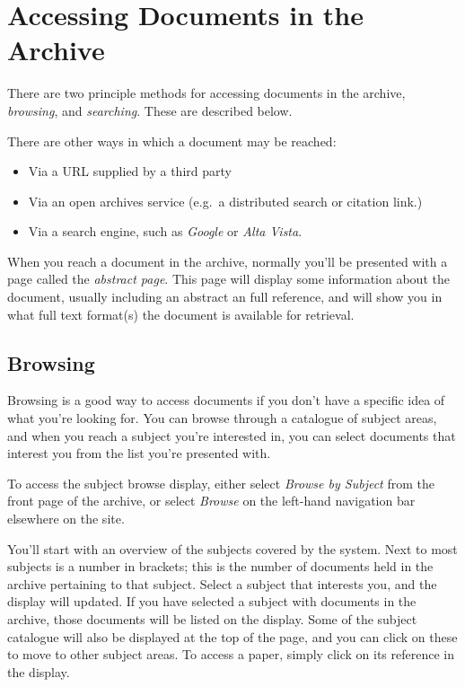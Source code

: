 
\section{Accessing Documents in the Archive}

There are two principle methods for accessing documents in the archive, \emph{browsing}, and \emph{searching}. These are described below.

There are other ways in which a document may be reached:

\begin{itemize}
\item Via a URL supplied by a third party
\item Via an open archives service (e.g.\ a distributed search or citation link.)
\item Via a search engine, such as \emph{Google} or \emph{Alta Vista}.
\end{itemize}

When you reach a document in the archive, normally you'll be presented with a page called the \emph{abstract page}. This page will display some information about the document, usually including an abstract an full reference, and will show you in what full text format(s) the document is available for retrieval.


\subsection{Browsing}

Browsing is a good way to access documents if you don't have a specific idea of what you're looking for. You can browse through a catalogue of subject areas, and when you reach a subject you're interested in, you can select documents that interest you from the list you're presented with.

To access the subject browse display, either select \emph{Browse by Subject} from the front page of the archive, or select \emph{Browse} on the left-hand navigation bar elsewhere on the site.

You'll start with an overview of the subjects covered by the system. Next to most subjects is a number in brackets; this is the number of documents held in the archive pertaining to that subject. Select a subject that interests you, and the display will updated. If you have selected a subject with documents in the archive, those documents will be listed on the display. Some of the subject catalogue will also be displayed at the top of the page, and you can click on these to move to other subject areas. To access a paper, simply click on its reference in the display.

